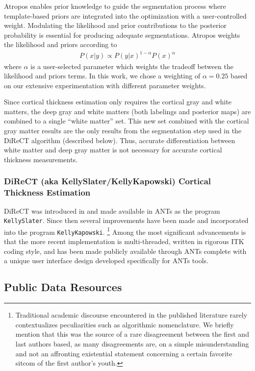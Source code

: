Atropos enables prior knowledge to guide the
segmentation process where template-based priors are integrated into the optimization
with a user-controlled weight.  Modulating the likelihood and prior contributions
to the posterior probability is essential for producing adequate segmentations.
Atropos weights the likelihood and priors according to
\begin{align}
P(x|y) \propto P(y|x)^{1-\alpha}P(x)^{\alpha}
\end{align}
where $\alpha$ is a user-selected parameter which weights the tradeoff between the likelihood and priors terms.
In this work, we chose a weighting of $\alpha = 0.25$ 
based on our extensive experimentation with different parameter weights.

Since cortical thickness estimation only requires the cortical gray
and white matters, the deep gray and white matters 
(both labelings and posterior maps) are combined to a single 
``white matter'' set.  This new set combined with the cortical
gray matter results are the only results from the segmentation
step used in the DiReCT algorithm (described below).  Thus, 
accurate differentiation between white matter and deep gray
matter is not necessary for accurate cortical thickness measurements. 


\subsubsection{DiReCT (aka KellySlater/KellyKapowski) Cortical Thickness Estimation}

DiReCT was introduced 
in \cite{das2009} and made available in ANTs as the program \verb#KellySlater#.
Since then several improvements have been made and incorporated into the program
\verb#KellyKapowski#.%
\footnote{
Traditional academic discourse encountered in the published literature
rarely contextualizes peculiarities such as algorithmic nomenclature.
We briefly mention that
this was the source of a rare disagreement between the first and last authors
based, as many disagreements are, on a simple misunderstanding and not an
affronting existential statement concerning a certain favorite sitcom
of the first author's youth. 
}
Among the most significant advancements is that the more recent
implementation is multi-threaded, written in rigorous ITK coding style, and 
has been made publicly available through  ANTs complete with a unique user 
interface design developed specifically for ANTs tools.  

\subsection{Public Data Resources}

